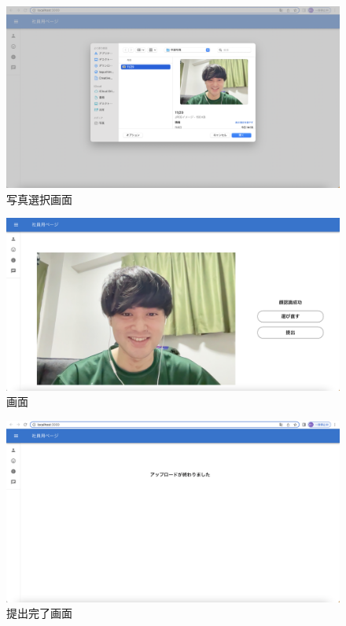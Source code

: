 \begin{figure}[!h]
	\begin{center}
			\includegraphics[scale=0.3, clip]{./img/sample2.png}
			\caption{写真選択画面}
			\label{fig:図の名前}
	\end{center}
\end{figure}

\begin{figure}[!h]
	\begin{center}
			\includegraphics[scale=0.3, clip]{./img/sample3.png}
			\caption{画面}
			\label{fig:図の名前}
	\end{center}
\end{figure}

\begin{figure}[!h]
	\begin{center}
			\includegraphics[scale=0.3, clip]{./img/sample4.png}
			\caption{提出完了画面}
			\label{fig:図の名前}
	\end{center}
\end{figure}

